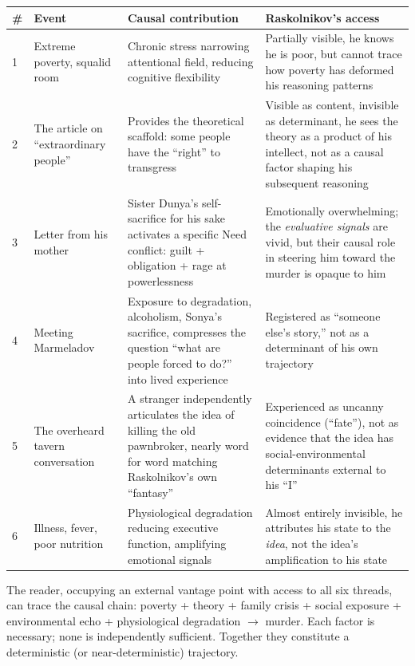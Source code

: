 \begin{center}\small
\begin{tabular}{@{}p{0.4cm}p{3.2cm}p{5.4cm}p{5.4cm}@{}}
\toprule
\# & Event & Causal contribution & Raskolnikov's access \\
\midrule
1 & Extreme poverty, squalid room & Chronic stress narrowing attentional field, reducing cognitive flexibility & Partially visible,  he knows he is poor, but cannot trace how poverty has deformed his reasoning patterns \\
2 & The article on ``extraordinary people'' & Provides the theoretical scaffold: some people have the ``right'' to transgress & Visible as content, invisible as determinant,  he sees the theory as a product of his intellect, not as a causal factor shaping his subsequent reasoning \\
3 & Letter from his mother & Sister Dunya's self-sacrifice for his sake activates a specific Need conflict: guilt + obligation + rage at powerlessness & Emotionally overwhelming; the \emph{evaluative signals} are vivid, but their causal role in steering him toward the murder is opaque to him \\
4 & Meeting Marmeladov & Exposure to degradation, alcoholism, Sonya's sacrifice,  compresses the question ``what are people forced to do?'' into lived experience & Registered as ``someone else's story,'' not as a determinant of his own trajectory \\
5 & The overheard tavern conversation & A stranger independently articulates the idea of killing the old pawnbroker,  nearly word for word matching Raskolnikov's own ``fantasy'' & Experienced as uncanny coincidence (``fate''), not as evidence that the idea has social-environmental determinants external to his ``I'' \\
6 & Illness, fever, poor nutrition & Physiological degradation reducing executive function, amplifying emotional signals & Almost entirely invisible,  he attributes his state to the \emph{idea}, not the idea's amplification to his state \\
\bottomrule
\end{tabular}
\end{center}


The reader, occupying an external vantage point with access to all six threads, can trace the causal chain: poverty + theory + family crisis + social exposure + environmental echo + physiological degradation $\rightarrow$ murder. Each factor is necessary; none is independently sufficient. Together they constitute a deterministic (or near-deterministic) trajectory.

